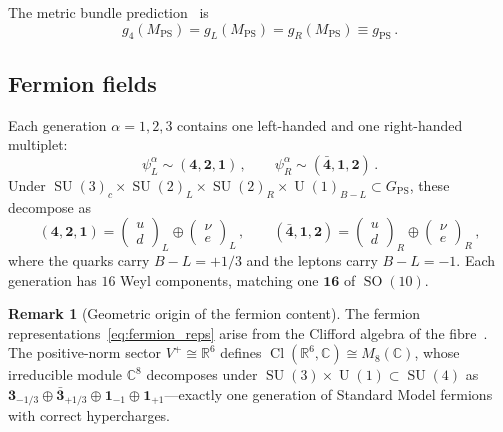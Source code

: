 \documentclass[12pt,a4paper]{article}
\theoremstyle{definition}
\newtheorem{remark}[theorem]{Remark}
\newcommand{\SO}{\operatorname{SO}}
\newcommand{\SU}{\operatorname{SU}}
\newcommand{\U}{\operatorname{U}}
\newcommand{\Cl}{\operatorname{Cl}}
\newcommand{\R}{\mathbb{R}}
\newcommand{\C}{\mathbb{C}}
\newcommand{\MPS}{M_{\mathrm{PS}}}
\newcommand{\gPS}{g_{\mathrm{PS}}}
\begin{document}
\noindent
The metric bundle prediction~\cite{Paper1} is
\begin{equation}
\label{eq:coupling_unification}
g_4(\MPS) = g_L(\MPS) = g_R(\MPS) \equiv \gPS\,.
\end{equation}

\subsection{Fermion fields}

Each generation $\alpha = 1, 2, 3$ contains one left-handed and one right-handed multiplet:
\begin{equation}
\label{eq:fermion_reps}
\psi^\alpha_L \sim (\mathbf{4}, \mathbf{2}, \mathbf{1})\,, \qquad
\psi^\alpha_R \sim (\bar{\mathbf{4}}, \mathbf{1}, \mathbf{2})\,.
\end{equation}
Under $\SU(3)_c \times \SU(2)_L \times \SU(2)_R \times \U(1)_{B-L} \subset G_{\mathrm{PS}}$, these decompose as
\begin{equation}
(\mathbf{4}, \mathbf{2}, \mathbf{1}) = \begin{pmatrix} u \\ d \end{pmatrix}_L \oplus \begin{pmatrix} \nu \\ e \end{pmatrix}_L\,, \qquad
(\bar{\mathbf{4}}, \mathbf{1}, \mathbf{2}) = \begin{pmatrix} u \\ d \end{pmatrix}_R \oplus \begin{pmatrix} \nu \\ e \end{pmatrix}_R\,,
\end{equation}
where the quarks carry $B{-}L = +1/3$ and the leptons carry $B{-}L = -1$.
Each generation has $16$ Weyl components, matching one $\mathbf{16}$ of $\SO(10)$.

\begin{remark}[Geometric origin of the fermion content]
The fermion representations~\eqref{eq:fermion_reps} arise from the Clifford algebra of the fibre~\cite{Paper2}.
The positive-norm sector $V^+ \cong \R^6$ defines $\Cl(\R^6, \C) \cong M_8(\C)$, whose irreducible module $\C^8$ decomposes under $\SU(3) \times \U(1) \subset \SU(4)$ as $\mathbf{3}_{-1/3} \oplus \bar{\mathbf{3}}_{+1/3} \oplus \mathbf{1}_{-1} \oplus \mathbf{1}_{+1}$---exactly one generation of Standard Model fermions with correct hypercharges.
\end{remark}
\end{document}

